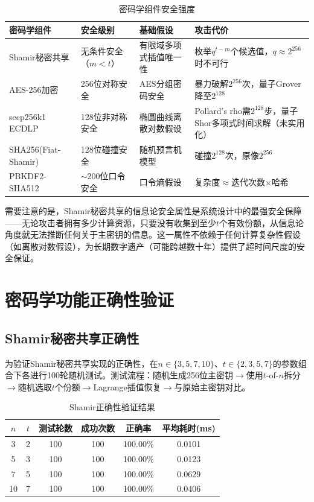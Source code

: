 \documentclass[UTF8,a4paper,zihao=-4,openany]{ctexrep}
\begin{document}
\begin{table}[htbp]
\centering
\small
\caption{密码学组件安全强度}
\setlength{\extrarowheight}{3pt}
\begin{tabularx}{\textwidth}{p{3cm}p{2.2cm}p{2.8cm}X}
\toprule
密码学组件 & 安全级别 & 基础假设 & 攻击代价\\
\midrule
Shamir秘密共享 & 无条件安全（$m<t$） & 有限域多项式插值唯一性 & 枚举$q^{t-m}$个候选值，$q\approx 2^{256}$时不可行\\
AES-256加密 & 256位对称安全 & AES分组密码安全 & 暴力破解$2^{256}$次，量子Grover降至$2^{128}$\\
secp256k1 ECDLP & 128位非对称安全 & 椭圆曲线离散对数假设 & Pollard's rho需$2^{128}$步，量子Shor多项式时间求解（未实用化）\\
SHA256(Fiat-Shamir) & 128位碰撞安全 & 随机预言机模型 & 碰撞$2^{128}$次，原像$2^{256}$\\
PBKDF2-SHA512 & $\sim$200位口令安全 & 口令熵假设 & 复杂度$\approx$迭代次数$\times$哈希\\
\bottomrule
\end{tabularx}
\end{table}

需要注意的是，Shamir秘密共享的信息论安全属性是系统设计中的最强安全保障——无论攻击者拥有多少计算资源，只要没有收集到至少$t$个有效份额，从信息论角度就无法推断任何关于主密钥的信息。这一属性不依赖于任何计算复杂性假设（如离散对数假设），为长期数字遗产（可能跨越数十年）提供了超时间尺度的安全保证。

\section{密码学功能正确性验证}

\subsection{Shamir秘密共享正确性}

为验证Shamir秘密共享实现的正确性，在$n \in \{3, 5, 7, 10\}$、$t \in \{2, 3, 5, 7\}$的参数组合下各进行100轮随机测试。测试流程：随机生成256位主密钥$\to$使用$t$-of-$n$拆分$\to$随机选取$t$个份额$\to$Lagrange插值恢复$\to$与原始主密钥对比。

\begin{table}[htbp]
\centering
\caption{Shamir正确性验证结果}
\label{tab:shamir_test}
\begin{tabularx}{\textwidth}{cccccc}
\toprule
$n$ & $t$ & 测试轮数 & 成功次数 & 正确率 & 平均耗时(ms)\\
\midrule
3 & 2 & 100 & 100 & 100.00\% & 0.0101\\
5 & 3 & 100 & 100 & 100.00\% & 0.0123\\
7 & 5 & 100 & 100 & 100.00\% & 0.0629\\
10 & 7 & 100 & 100 & 100.00\% & 0.0406\\
\bottomrule
\end{tabularx}
\end{table}
\end{document}
